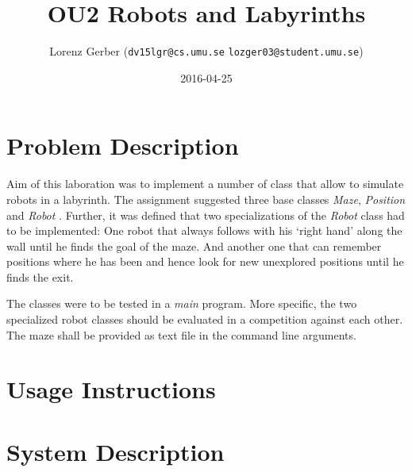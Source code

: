 \documentclass[a4paper,11pt,twoside]{article}
\title{OU2 Robots and Labyrinths}
\author{Lorenz Gerber ({\tt{dv15lgr@cs.umu.se}} {\tt{lozger03@student.umu.se}})}
\date{2016-04-25}
\begin{document}
\lstset{language=C}
\maketitle
\thispagestyle{empty}
\newpage
\tableofcontents
\thispagestyle{empty}
\newpage

\clearpage
{}

\section{Problem Description} 
Aim of this laboration was to implement a number of class that allow
to simulate robots in a labyrinth. The assignment suggested three base
classes \textit{Maze}, \textit{Position} and \textit{Robot}
\cite{maze}. Further, it was defined that two specializations of the
\textit{Robot} class had to be implemented: One robot that always
follows with his `right hand' along the wall until he finds the
goal of the maze. And another one that can remember positions where he has
been and hence look for new unexplored positions until he finds the exit.

The classes were to be tested in a \textit{main} program. More
specific, the two specialized robot classes should be evaluated in a
competition against each other. The maze shall be provided as text
file in the command line arguments. 

\section{Usage Instructions}


\section{System Description}
\end{document}
